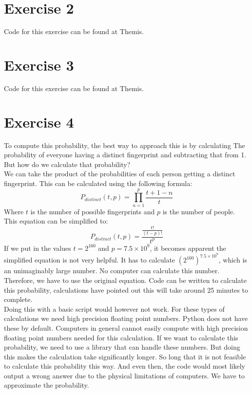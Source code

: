 \documentclass[twoside, a4paper, fleqn, reqno]{article}
\begin{document}
\section*{Exercise 2}

Code for this exercise can be found at Themis.

\section*{Exercise 3}

Code for this exercise can be found at Themis.

\section*{Exercise 4}

To compute this probability, the best way to approach this is by calculating The
probability of everyone having a distinct fingerprint and subtracting that from 1.
But how do we calculate that probability?\\
We can take the product of the probabilities of each person getting a distinct fingerprint.
This can be calculated using the following formula:
\begin{equation}
	\label{eq:1}
	P_{distinct}(t, p)=\prod_{n=1}^{p} \frac{t+1-n}{t}
\end{equation}
Where $t$ is the number of possible fingerprints and $p$ is the number of people.
This equation can be simplified to:
\begin{equation}
	\label{eq:2}
	P_{distinct}(t, p)=\frac{\frac{t!}{(t-p)!}}{t^p}
\end{equation}
If we put in the values $t=2^{160}$ and $p=7.5\times10^{9}$, it becomes apparent the simplified
equation is not very helpful. It has to calculate $(2^{160})^{7.5\times10^{9}}$, which is an unimaginably large number.
No computer can calculate this number. Therefore, we have to use the original equation.
Code can be written to calculate this probability, calculations have pointed out this will take
around 25 minutes to complete.\\
Doing this with a basic script would however not work. For these types of calculations we need
high precision floating point numbers. Python does not have these by default. Computers in general
cannot easily compute with high precision floating point numbers needed for this calculation.
If we want to calculate this probability, we need to use a library that can handle these numbers.
But doing this makes the calculation take significantly longer. So long that it is not feasible to
calculate this probability this way. And even then, the code would most likely output a wrong
answer due to the physical limitations of computers. We have to approximate the probability.
\end{document}

